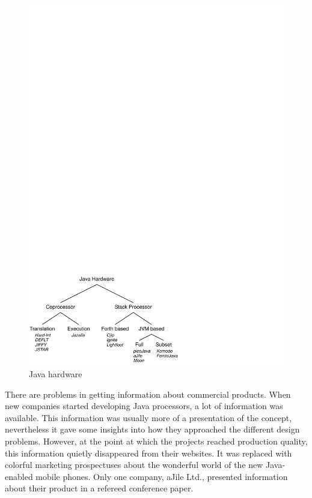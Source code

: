\begin{figure}
    \centering
    \includegraphics[scale=\picscale]{related/related_tree}
    \caption{Java hardware}
    \label{fig_related_tree}
\end{figure}


There are problems in getting information about commercial products.
When new companies started developing Java processors, a lot of
information was available. This information was usually more of a
presentation of the concept, nevertheless it gave some insights into
how they approached the different design problems. However, at the
point at which the projects reached production quality, this
information quietly disappeared from their websites. It was replaced
with colorful marketing prospectuses about the wonderful world of
the new Java-enabled mobile phones. Only one company, aJile Ltd.,
presented information about their product in a refereed conference
paper.

